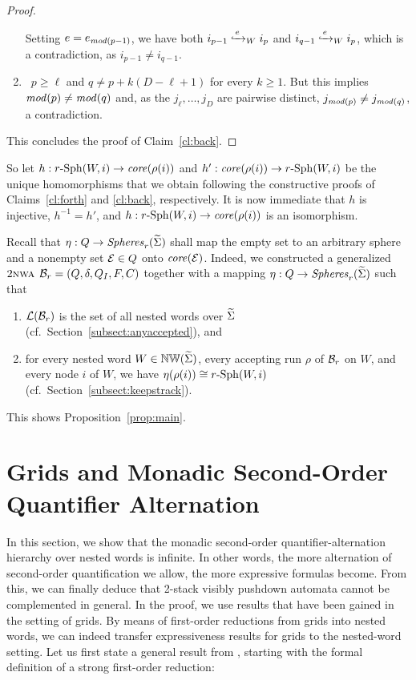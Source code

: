 \documentclass{LMCS}
\begin{document}
\begin{proof}
\begin{enumerate}
  Setting $e = e_{\modit(p-1)}$, we have both $\Wleadsto{W}{e}{i_{p-1}}{i_p}$
  and $\Wleadsto{W}{e}{i_{q-1}}{i_p}$, which is a contradiction, as $i_{p-1}
  \neq i_{q-1}$.
\item{}\ $p \ge \ell$ and $q \neq p + k(D - \ell + 1)$ for every $k \ge
  1$. But this implies $\modit(p) \neq \modit(q)$ and, as the
  $j_\ell,\ldots,j_D$ are pairwise distinct, $j_{\modit(p)} \neq
  j_{\modit(q)}$, a contradiction.
\end{enumerate}
This concludes the proof of Claim~\ref{cl:back}.
\end{proof}
So let $h: \Sph{\radius}{W}{i} \rightarrow \core(\rho(i))$ and $h':
\core(\rho(i)) \rightarrow \Sph{\radius}{W}{i}$ be the unique homomorphisms
that we obtain following the constructive proofs of Claims~\ref{cl:forth} and
\ref{cl:back}, respectively. It is now immediate that $h$ is injective,
$h^{-1} = h'$, and $h: \Sph{\radius}{W}{i} \rightarrow \core(\rho(i))$ is an
isomorphism.

Recall that $\eta: Q \rightarrow \AllSpheres_\radius(\crSigma)$ shall map the
empty set to an arbitrary sphere and a nonempty set $\State \in Q$ onto
$\core(\State)$. Indeed, we constructed a generalized $\tNWA$
$\WA_\radius=(Q,\delta,\Init,F,C)$ together with a mapping $\eta: Q
\rightarrow \AllSpheres_\radius(\crSigma)$ such that
\begin{enumerate}[$\bullet$]
\item $\Lang(\WA_\radius)$ is the set of all nested words over $\crSigma$
  (cf.\ Section~\ref{subsect:anyaccepted}), and
\item for every nested word $W \in \NW(\crSigma)$, every accepting run $\rho$
  of $\WA_\radius$ on $W$, and every node $i$ of $W$, we have $\eta(\rho(i))
  \isom \Sph{\radius}{W}{i}$ (cf.\ Section~\ref{subsect:keepstrack}).
\end{enumerate}
This shows Proposition~\ref{prop:main}.












\section{Grids and Monadic Second-Order Quantifier
  Alternation}\label{sec:grids}

In this section, we show that the monadic second-order quantifier-alternation
hierarchy over nested words is infinite. In other words, the more alternation
of second-order quantification we allow, the more expressive formulas become.
From this, we can finally deduce that 2-stack visibly pushdown automata cannot
be complemented in general. In the proof, we use results that have been gained
in the setting of grids. By means of first-order reductions from grids into
nested words, we can indeed transfer expressiveness results for grids to the
nested-word setting. Let us first state a general result from \cite{MST02},
starting with the formal definition of a strong first-order reduction:
\end{document}
